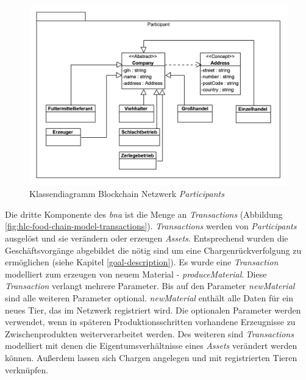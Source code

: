 \begin{figure}[H]
	\centering
	\includegraphics[width=1\linewidth]{pictures/hlc-food-chain-model-participants}
	\caption[Klassendiagramm Blockchain Netzwerk \textit{Participants}]{Klassendiagramm Blockchain Netzwerk \textit{Participants}}
	\label{fig:hlc-food-chain-model-participants}
\end{figure}

Die dritte Komponente des \textit{\ac{bna}} ist die Menge an \textit{Transactions} (Abbildung \ref{fig:hlc-food-chain-model-transactions}). \textit{Transactions} werden von \textit{Participants} ausgelöst und sie verändern oder erzeugen \textit{Assets}. Entsprechend wurden die Geschäftsvorgänge abgebildet die nötig sind um eine Chargenrückverfolgung zu ermöglichen (siehe Kapitel \ref{goal-description}). Es wurde eine \textit{Transaction} modelliert zum erzeugen von neuem Material - \textit{produceMaterial}. Diese \textit{Transaction} verlangt mehrere Parameter. Bis auf den Parameter \textit{newMaterial} sind alle weiteren Parameter optional. \textit{newMaterial} enthält alle Daten für ein neues Tier, das im Netzwerk registriert wird. Die optionalen Parameter werden verwendet, wenn in späteren Produktionsschritten vorhandene Erzeugnisse zu Zwischenprodukten weiterverarbeitet werden. Des weiteren sind \textit{Transactions} modelliert mit denen die Eigentumsverhältnisse eines \textit{Assets} verändert werden können. Außerdem lassen sich Chargen angelegen und mit registrierten Tieren verknüpfen. 

